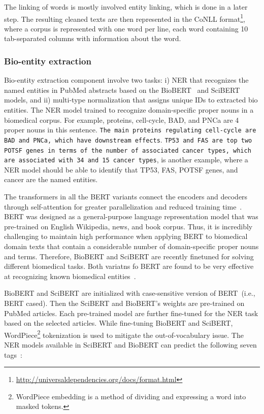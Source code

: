 \hspace*{3.5mm} The linking of words is mostly involved entity linking, which is done in a later step. The resulting cleaned texts are then represented in  the CoNLL format\footnote{\url{http://universaldependencies.org/docs/format.html}}, where a corpus is represented with one word per line, each word containing 10 tab-separated columns with information about the word. 

\subsubsection{Bio-entity extraction}
Bio-entity extraction component involve two tasks: i) NER that recognizes the named entities in PubMed abstracts based on the BioBERT~\cite{BioBERT} and SciBERT~\cite{SciBERT} models, and ii) multi-type normalization that assigns unique IDs to extracted bio entities. The NER model trained to recognize domain-specific proper nouns in a biomedical corpus. For example, proteins, cell-cycle, BAD, and PNCa are 4 proper nouns in this sentence. \texttt{The main proteins regulating cell-cycle are BAD and PNCa, which have downstream effects}. \texttt{TP53 and FAS are top two POTSF genes in terms of the number of associated cancer types, which are associated with 34 and 15 cancer types}, is another example, where a NER model should be able to identify that TP53, FAS, POTSF genes, and cancer are the named entities. 

\hspace*{3.5mm} The transformers in all the BERT variants connect the encoders and decoders through self-attention for greater parallelization and reduced training time~\cite{hasan2020knowledge,kim2019neural}. BERT was designed as a general-purpose language representation model that was pre-trained on English Wikipedia, news, and book corpus. Thus, it is incredibly challenging to maintain high performance when applying BERT to biomedical domain texts that contain a considerable number of domain-specific proper nouns and terms. 
Therefore, BioBERT and SciBERT are recently finetuned for solving different biomedical tasks. Both variatns fo BERT are found to be very effective at recognizing known biomedical entities~\cite{kim2019neural}. 

\hspace*{3.5mm} BioBERT and SciBERT are initialized with case-sensitive version of BERT~(i.e., BERT cased). Then the SciBERT and BioBERT's weights are pre-trained on PubMed articles. Each pre-trained model are further fine-tuned for the NER task based on the selected articles. While fine-tuning BioBERT and SciBERT,  WordPiece\footnote{WordPiece embedding is a method of dividing and expressing a word into masked tokens.} tokenization is used to mitigate the out-of-vocabulary issue. The NER models available in SciBERT and BioBERT can predict the following seven tags~\cite{kim2019neural}: 

